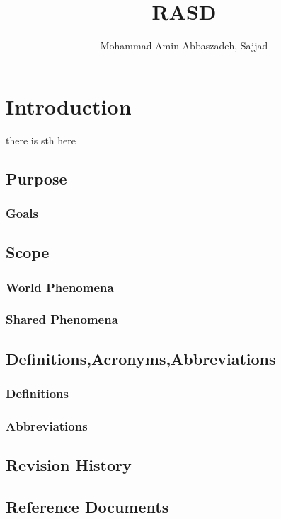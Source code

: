 \documentclass{article}
\title{RASD}
\author{Mohammad Amin Abbaszadeh, Sajjad}
\begin{document}
\maketitle
\doublespacing
\hypersetup{linkcolor=black}

\tableofcontents
\newpage
\section{Introduction}
there is sth here


\subsection{Purpose}


\subsubsection{Goals}


\subsection{Scope}

\subsubsection{World Phenomena}

\subsubsection{Shared Phenomena}

\subsection{Definitions,Acronyms,Abbreviations}

\subsubsection{Definitions}

\subsubsection{Abbreviations}

\subsection{Revision History}

\subsection{Reference Documents}
\end{document}
